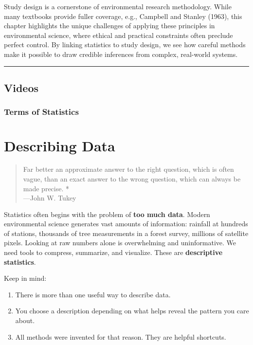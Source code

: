 \documentclass[
  letterpaper,
  DIV=11,
  numbers=noendperiod]{scrreprt}
\providecommand{\tightlist}{%
  \setlength{\itemsep}{0pt}\setlength{\parskip}{0pt}}
\begin{document}
Study design is a cornerstone of environmental research methodology.
While many textbooks provide fuller coverage, e.g., Campbell and Stanley
(1963), this chapter highlights the unique challenges of applying these
principles in environmental science, where ethical and practical
constraints often preclude perfect control. By linking statistics to
study design, we see how careful methods make it possible to draw
credible inferences from complex, real-world systems.

\begin{center}\rule{0.5\linewidth}{0.5pt}\end{center}

\section{Videos}\label{videos}

\subsection{Terms of Statistics}\label{terms-of-statistics}


\chapter{Describing Data}\label{DescribingData}

\begin{quote}
Far better an approximate answer to the right question, which is often
vague, than an exact answer to the wrong question, which can always be
made precise. *\\
---John W. Tukey
\end{quote}

Statistics often begins with the problem of \textbf{too much data}.
Modern environmental science generates vast amounts of information:
rainfall at hundreds of stations, thousands of tree measurements in a
forest survey, millions of satellite pixels. Looking at raw numbers
alone is overwhelming and uninformative. We need tools to compress,
summarize, and visualize. These are \textbf{descriptive statistics}.

Keep in mind:

\begin{enumerate}
\def\labelenumi{\arabic{enumi}.}
\tightlist
\item
  There is more than one useful way to describe data.
\item
  You choose a description depending on what helps reveal the pattern
  you care about.
\item
  All methods were invented for that reason. They are helpful shortcuts.
\end{enumerate}
\end{document}
